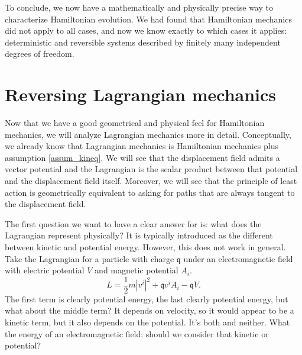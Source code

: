 To conclude, we now have a mathematically and physically precise way to characterize Hamiltonian evolution. We had found that Hamiltonian mechanics did not apply to all cases, and now we know exactly to which cases it applies: deterministic and reversible systems described by finitely many independent degrees of freedom. 

\section{Reversing Lagrangian mechanics}

Now that we have a good geometrical and physical feel for Hamiltonian mechanics, we will analyze Lagrangian mechanics more in detail. Conceptually, we already know that Lagrangian mechanics is Hamiltonian mechanics plus assumption \ref{assum_kineq}. We will see that the displacement field admits a vector potential and the Lagrangian is the scalar product between that potential and the displacement field itself. Moreover, we will see that the principle of least action is geometrically equivalent to asking for paths that are always tangent to the displacement field.

The first question we want to have a clear answer for is: what does the Lagrangian represent physically? It is typically introduced as the different between kinetic and potential energy. However, this does not work in general. Take the Lagrangian for a particle with charge $\mathfrak{q}$ under an electromagnetic field with electric potential $V$ and magnetic potential $A_i$.
\begin{equation}
	L = \frac{1}{2} m |v^i|^2 + \mathfrak{q} v^i A_i -\mathfrak{q} V.
\end{equation}
The first term is clearly potential energy, the last clearly potential energy, but what about the middle term? It depends on velocity, so it would appear to be a kinetic term, but it also depends on the potential. It's both and neither. What the energy of an electromagnetic field: should we consider that kinetic or potential?

